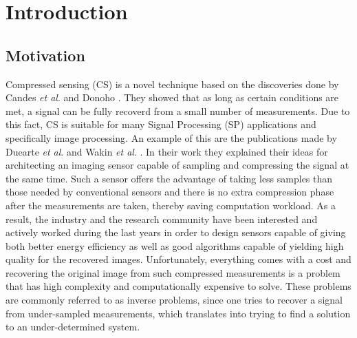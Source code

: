 \chapter{Introduction}
\section{Motivation}
Compressed sensing (CS) is a novel technique based on the discoveries done by Candes \textit{et al}. \cite{CandesR07} and Donoho \cite{Donoho01}. They showed that as long as certain conditions are met, a signal can be fully recoverd from a small number of measurements. Due to this fact, CS is suitable for many Signal Processing (SP) applications and specifically image processing. An example of this are the publications made by Duearte \textit{et al}. and Wakin \textit{et al}. \cite{duarte2008single,wakin2006architecture}. In their work they explained their ideas for architecting an imaging sensor capable of sampling and compressing the signal at the same time. Such a sensor offers the advantage of taking less samples than those needed by conventional sensors and there is no extra compression phase after the measurements are taken, thereby saving computation workload. As a result, the industry and the research community have been interested and actively worked during the last years in order to design sensors capable of giving both better energy efficiency as well as good algorithms capable of yielding high quality for the recovered images. Unfortunately, everything comes with a cost and recovering the original image from such compressed measurements is a problem that has high complexity and computationally expensive to solve. These problems are commonly referred to as inverse problems, since one tries to recover a signal from under-sampled measurements, which translates into trying to find a solution to an under-determined system. \

